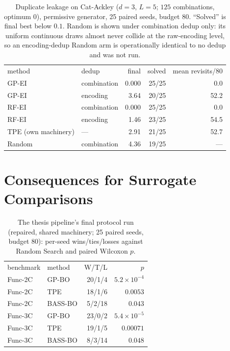\documentclass[%
 aip,
 amsmath,amssymb,
 floatfix,
 reprint,%
]{revtex4-1}
\begin{document}
\begin{table}[t]
\caption{\label{tab:dedup}Duplicate leakage on Cat-Ackley ($d{=}3$,
$L{=}5$; $125$ combinations, optimum $0$), permissive generator, 25
paired seeds, budget 80. ``Solved'' is final best below $0.1$. Random is
shown under combination dedup only: its uniform continuous draws almost
never collide at the raw-encoding level, so an encoding-dedup Random arm
is operationally identical to no dedup and was not run.}
\begin{ruledtabular}
\begin{tabular}{llrrr}
method & dedup & final & solved & mean revisits/80 \\
\colrule
GP-EI & combination & 0.000 & 25/25 & 0.0 \\
GP-EI & encoding    & 3.64  & 20/25 & 52.2 \\
RF-EI & combination & 0.000 & 25/25 & 0.0 \\
RF-EI & encoding    & 1.46  & 23/25 & 54.5 \\
TPE (own machinery) & --- & 2.91 & 21/25 & 52.7 \\
Random & combination & 4.36 & 19/25 & --- \\
\end{tabular}
\end{ruledtabular}
\end{table}

\section{Consequences for Surrogate Comparisons}
\label{sec:conseq}

\begin{table}[t]
\caption{\label{tab:thesis}The thesis pipeline's final protocol run
(repaired, shared machinery; 25 paired seeds, budget 80): per-seed
wins/ties/losses against Random Search and paired Wilcoxon $p$.}
\begin{ruledtabular}
\begin{tabular}{llrr}
benchmark & method & W/T/L & $p$ \\
\colrule
Func-2C & GP-BO   & 20/1/4  & $5.2\times10^{-4}$ \\
Func-2C & TPE     & 18/1/6  & $0.0053$ \\
Func-2C & BASS-BO & 5/2/18  & $0.043$ \\
Func-3C & GP-BO   & 23/0/2  & $5.4\times10^{-5}$ \\
Func-3C & TPE     & 19/1/5  & $0.00071$ \\
Func-3C & BASS-BO & 8/3/14  & $0.048$ \\
\end{tabular}
\end{ruledtabular}
\end{table}
\end{document}
